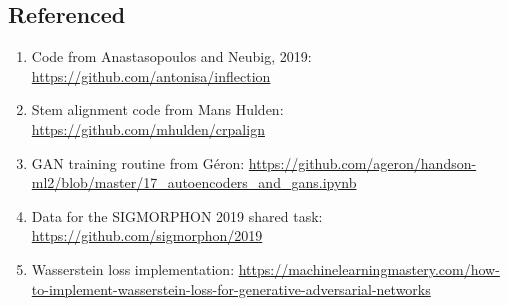 \documentclass{article}
\begin{document}
    \subsection*{Referenced}
      \begin{enumerate}
        \item Code from Anastasopoulos and Neubig, 2019: \url{https://github.com/antonisa/inflection}
        \item Stem alignment code from Mans Hulden: \url{https://github.com/mhulden/crpalign}
        \item GAN training routine from Géron: \url{https://github.com/ageron/handson-ml2/blob/master/17_autoencoders_and_gans.ipynb}
        \item Data for the SIGMORPHON 2019 shared task: \url{https://github.com/sigmorphon/2019}
        \item Wasserstein loss implementation: \url{https://machinelearningmastery.com/how-to-implement-wasserstein-loss-for-generative-adversarial-networks}
      \end{enumerate}
  
\end{document}
